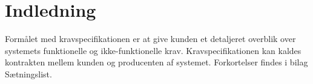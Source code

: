 \chapter{Indledning}\label{Formal}
Formålet med kravspecifikationen er at give kunden et detaljeret overblik over systemets funktionelle og ikke-funktionelle krav. Kravspecifikationen kan kaldes kontrakten mellem kunden og producenten af systemet. Forkortelser findes i bilag Sætningslist. 